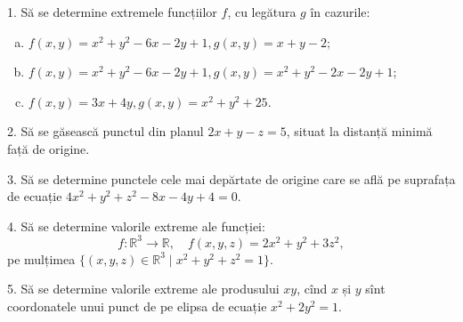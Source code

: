 \documentclass[11pt,a4paper]{article}
\newcommand\RR{\mathbb{R}}
\theoremstyle{dotless}
\theoremstyle{dotlessdr}
\begin{document}
1. Să se determine extremele funcțiilor $f$, cu legătura $g$ în cazurile:
\begin{enumerate}[(a)]
\item $f(x, y) = x^2 + y^2 - 6x - 2y + 1, g(x, y) = x + y - 2$;
\item $f(x, y) = x^2 + y^2 - 6x - 2y + 1, g(x, y) = x^2 + y^2 - 2x - 2y + 1$;
\item $f(x, y) = 3x + 4y, g(x, y) = x^2 + y^2 + 25$.
\end{enumerate}

\vspace{1cm}

2. Să se găsească punctul din planul $2x + y - z = 5$, situat la distanță minimă
față de origine.

\vspace{1cm}

3. Să se determine punctele cele mai depărtate de origine care se află pe
suprafața de ecuație $4x^2 + y^2 + z^2 - 8x - 4y + 4 = 0$.

\vspace{1cm}

4. Să se determine valorile extreme ale funcției:
\[
  f: \RR^3 \to \RR, \quad f(x, y, z) = 2x^2 + y^2 + 3z^2,
\]
pe mulțimea $\{(x, y, z) \in \RR^3 \mid x^2 + y^2 + z^2 = 1 \}$.

\vspace{1cm}

5. Să se determine valorile extreme ale produsului $xy$, cînd $x$ și $y$ sînt
coordonatele unui punct de pe elipsa de ecuație $x^2 + 2y^2 = 1$.
\end{document}
